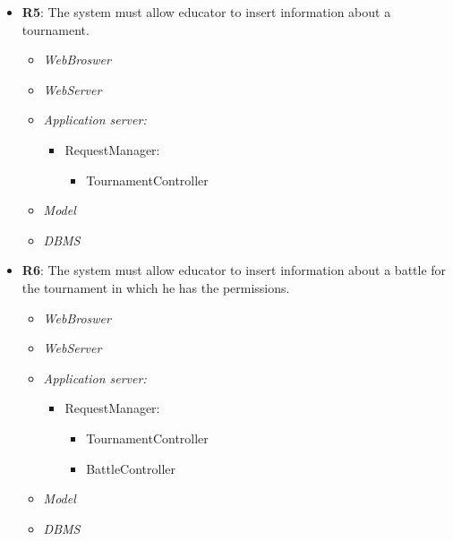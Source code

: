 \begin{itemize}
        \item \textbf{R5}: The system must allow educator to insert information about a tournament.
            \begin{itemize}
                \item \textit{WebBroswer}
                \item \textit{WebServer}
                \item \textit{Application server:}\begin{itemize}
                    \item RequestManager:\begin{itemize}
                        \item TournamentController
                    \end{itemize}
                \end{itemize}
                \item \textit{Model}
                \item \textit{DBMS}
            \end{itemize}

            
        \item \textbf{R6}: The system must allow educator to insert information about a battle for the tournament in which
he has the permissions.
            \begin{itemize}
                  \item \textit{WebBroswer}
                \item \textit{WebServer}
                \item \textit{Application server:}\begin{itemize}
                    \item RequestManager:\begin{itemize}
                        \item TournamentController
                        \item  BattleController
                    \end{itemize}
                \end{itemize}
                \item \textit{Model}
                \item \textit{DBMS}
            \end{itemize}



\end{itemize}
